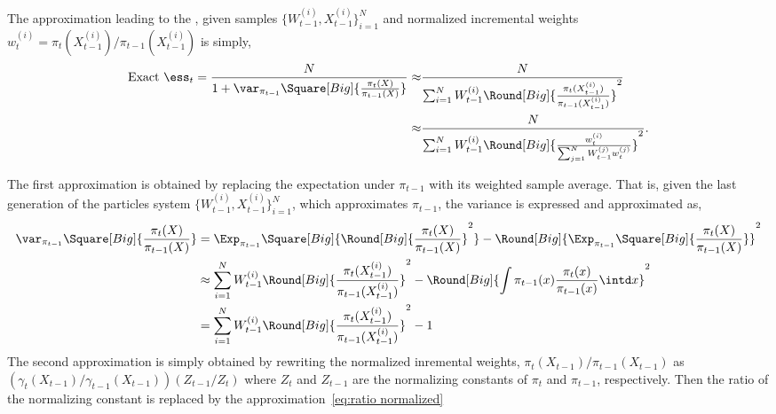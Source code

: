 The approximation leading to the \cess, given samples $\{W_{t-1}^{(i)},X_{t-1}^{(i)}\}_{i=1}^N$ and normalized incremental weights $w_{t}^{(i)} = \pi_t(X_{t-1}^{(i)})/\pi_{t-1}(X_{t-1}^{(i)})$ is simply,
\begin{align*}
  \text{Exact }\ess_t = \frac{N}{1 + \var_{\pi_{t-1}}
    \Square[Big]{\frac{\pi_t(X)}{\pi_{t-1}(X)}}}
  \approx& \frac{N}{\sum_{i=1}^N W_{t-1}^{(i)} 
    \Round[Big]{\frac{\pi_t(X_{t-1}^{(i)})}{\pi_{t-1}(X_{t-1}^{(i)})}}^2}\\
  \approx& \frac{N}{\sum_{i=1}^N W_{t-1}^{(i)}
    \Round[Big]{\frac{w_t^{(i)}}{\sum_{j=1}^N W_{t-1}^{(j)} w_t^{(j)}}}^2}.
\end{align*}
\begin{draftpar}
The first approximation is obtained by replacing the expectation under $\pi_{t-1}$ with its weighted sample average. That is, given the last generation of the particles system $\{W_{t-1}^{(i)}, X_{t-1}^{(i)}\}_{i=1}^N$, which approximates $\pi_{t-1}$, the variance is expressed and approximated as,
\begin{align*}
  \var_{\pi_{t-1}}\Square[Big]{\frac{\pi_t(X)}{\pi_{t-1}(X)}}
  &= \Exp_{\pi_{t-1}}\Square[Big]{\Round[Big]{\frac{\pi_t(X)}{\pi_{t-1}(X)}}^2} -
  \Round[Big]{\Exp_{\pi_{t-1}}\Square[Big]{\frac{\pi_t(X)}{\pi_{t-1}(X)}}}^2 \\
  &\approx \sum_{i=1}^N W_{t-1}^{(i)} \Round[Big]{\frac{\pi_t(X_{t-1}^{(i)})}{\pi_{t-1}(X_{t-1}^{(i)})}}^2
  - \Round[Big]{\int \pi_{t-1}(x)\frac{\pi_t(x)}{\pi_{t-1}(x)}\intd x}^2 \\
  &= \sum_{i=1}^N W_{t-1}^{(i)} \Round[Big]{\frac{\pi_t(X_{t-1}^{(i)})}{\pi_{t-1}(X_{t-1}^{(i)})}}^2 - 1
\end{align*}
The second approximation is simply obtained by rewriting the normalized inremental weights, $\pi_t(X_{t-1})/\pi_{t-1}(X_{t-1})$ as $(\gamma_t(X_{t-1})/\gamma_{t-1}(X_{t-1}))(Z_{t-1}/Z_t)$ where $Z_t$ and $Z_{t-1}$ are the normalizing constants of $\pi_t$ and $\pi_{t-1}$, respectively. Then the ratio of the normalizing constant is replaced by the approximation~\ref{eq:ratio normalized}
\end{draftpar}

